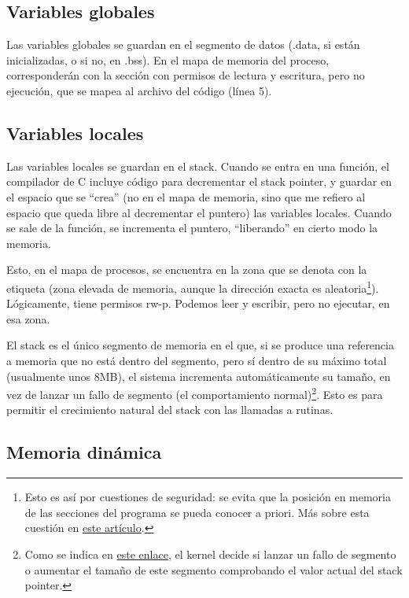 \documentclass[a4paper]{article}
\begin{document}
\subsection{Variables globales}

Las variables globales se guardan en el segmento de datos ({\ttfamily.data}, si están inicializadas, o si no, en {\ttfamily.bss}). En el mapa de memoria del proceso, corresponderán con la sección con permisos de lectura y escritura, pero no ejecución, que se mapea al archivo del código (línea 5).

\subsection{Variables locales}

Las variables locales se guardan en el stack. Cuando se entra en una función, el compilador de C incluye código para decrementar el stack pointer, y guardar en el espacio que se ``crea'' (no en el mapa de memoria, sino que me refiero al espacio que queda libre al decrementar el puntero) las variables locales. Cuando se sale de la función, se incrementa el puntero, ``liberando'' en cierto modo la memoria.

Esto, en el mapa de procesos, se encuentra en la zona que se denota con la etiqueta {\ttfamily [stack]} (zona elevada de memoria, aunque la dirección exacta es aleatoria\footnote{Esto es así por cuestiones de seguridad: se evita que la posición en memoria de las secciones del programa se pueda conocer a priori. Más sobre esta cuestión en \href{https://manybutfinite.com/post/anatomy-of-a-program-in-memory/}{este artículo}.}). Lógicamente, tiene permisos {\ttfamily rw-p}. Podemos leer y escribir, pero no ejecutar, en esa zona.

El stack es el único segmento de memoria en el que, si se produce una referencia a memoria que no está dentro del segmento, pero sí dentro de su máximo total (usualmente unos 8MB), el sistema incrementa automáticamente su tamaño, en vez de lanzar un fallo de segmento (el comportamiento normal)\footnote{Como se indica en \href{https://stackoverflow.com/questions/54564273/dynamic-expansion-of-the-linux-stack}{este enlace}, el kernel decide si lanzar un fallo de segmento o aumentar el tamaño de este segmento comprobando el valor actual del stack pointer.}. Esto es para permitir el crecimiento natural del {\ttfamily stack} con las llamadas a rutinas.

\subsection{Memoria dinámica}
\end{document}
